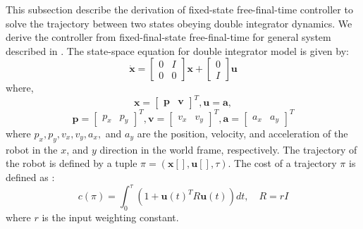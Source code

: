\documentclass[conference]{IEEEtran}
\begin{document}
This subsection describe the derivation of fixed-state free-final-time controller to solve the trajectory between two states obeying double integrator dynamics. We derive the controller from fixed-final-state free-final-time for general system described in \cite{webb2013kinodynamic}.
The state-space equation for double integrator model is given by:
\begin{equation} \label{dbl_int_state_space_eq}
\dot{\boldsymbol{x}} = \begin{bmatrix}
0 & I \\
0 & 0
\end{bmatrix}\boldsymbol{x} + \begin{bmatrix}
0 \\
I
\end{bmatrix}\boldsymbol{u}
\end{equation}
where, 
\begin{equation*} \label{dbl_int_label_eq}
\boldsymbol{x} = 
\begin{bmatrix}
\boldsymbol{p} &
\boldsymbol{v}
\end{bmatrix}^{T},
\boldsymbol{u} = \boldsymbol{a},
\end{equation*}
\begin{equation*}
\boldsymbol{p} = 
\begin{bmatrix} 
p_x &
p_y
\end{bmatrix}^{T},
\boldsymbol{v} =
\begin{bmatrix}
v_x &
v_y
\end{bmatrix}^{T},
\boldsymbol{a} = 
\begin{bmatrix}
a_x &
a_y
\end{bmatrix}^{T}
\end{equation*}
where $p_x, p_y, v_x, v_y, a_x,$ and $a_y$ are the position, velocity, and acceleration of the robot in the $x$, and $y$ direction in the world frame, respectively. The trajectory of the robot is defined by a tuple $\pi = (\boldsymbol{x}[], \boldsymbol{u}[], \tau)$. The cost of a trajectory $\pi$ is defined as :
\begin{equation} \label{cost_eq}
c(\pi) = \int_{0}^{\tau}(1+\boldsymbol{u}(t)^{T}R\boldsymbol{u}(t))dt, \quad R = rI
\end{equation}
where $r$ is the input weighting constant.
\end{document}
